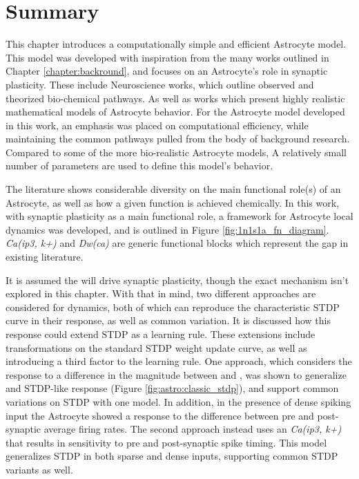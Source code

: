 
\section{Summary}

This chapter introduces a computationally simple and efficient Astrocyte
model. This model was developed with inspiration from the many works outlined in
Chapter \ref{chapter:backround}, and focuses on an Astrocyte's role in synaptic
plasticity. These include Neuroscience works, which outline observed and
theorized bio-chemical pathways. As well as works which present highly realistic
mathematical models of Astrocyte behavior. For the Astrocyte model developed in
this work, an emphasis was placed on computational efficiency, while maintaining
the common pathways pulled from the body of background research. Compared to
some of the more bio-realistic Astrocyte models, A relatively small number of
parameters are used to define this model's behavior.

The literature shows considerable diversity on the main functional role(s) of an
Astrocyte, as well as how a given function is achieved chemically. In this work,
with synaptic plasticity as a main functional role, a framework for Astrocyte
local dynamics was developed, and is outlined in Figure
\ref{fig:1n1s1a_fn_diagram}. \emph{Ca(ip3, k+)} and \emph{Dw(ca)} are generic
functional blocks which represent the gap in existing literature.

It is assumed the \ca will drive synaptic plasticity, though the exact mechanism
isn't explored in this chapter. With that in mind, two different approaches are
considered for \ca dynamics, both of which can reproduce the characteristic
STDP curve in their \ca response, as well as common variation. It is discussed
how this \ca response could extend STDP as a learning rule. These
extensions include transformations on the standard STDP weight update curve, as
well as introducing a third factor to the learning rule. One approach, which
considers the \ca response to a difference in the magnitude between \ipt and
\kp, was shown to generalize and STDP-like response (Figure
\ref{fig:astro:classic_stdp}), and support common variations on
STDP with one model. In addition, in the presence of dense spiking input the
Astrocyte showed a response to the difference between pre and post-synaptic
average firing rates. The second approach instead uses an \emph{Ca(ip3, k+)} that
results in sensitivity to pre and post-synaptic spike timing. This model
generalizes STDP in both sparse and dense inputs, supporting common STDP
variants as well.

